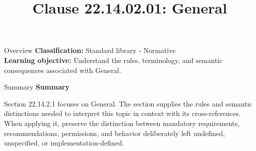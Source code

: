 \documentclass[10pt,letterpaper]{article}
\title{Clause 22.14.02.01: General}
\author{}
\date{}
\begin{document}
\maketitle
\begin{CornellOverviewBox}{Overview}
\textbf{Classification:} Standard library - Normative\\[2pt]
\textbf{Learning objective:} Understand the rules, terminology, and semantic consequences associated with General.
\end{CornellOverviewBox}\begin{CornellSummaryBox}{Summary}
{\sffamily\bfseries\color{Accent} Summary}\par\vspace{3pt}Section 22.14.2.1 focuses on General. The section supplies the rules and semantic distinctions needed to interpret this topic in context with its cross-references. When applying it, preserve the distinction between mandatory requirements, recommendations, permissions, and behavior deliberately left undefined, unspecified, or implementation-defined.
\end{CornellSummaryBox}
\end{document}
